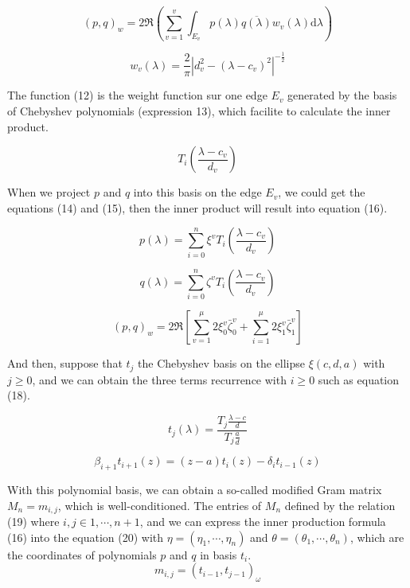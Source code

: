 {\begin{equation}
(p,q)_w=2\Re(\sum_{v=1}^v \int_{E_v}p(\lambda) \overline{q(\lambda)} w_v(\lambda)\mathrm{d}\lambda)
\end{equation}

\begin{equation}
w_v(\lambda)=\frac{2}{\pi}|d_v^2-(\lambda-c_v)^2|^{-\frac{1}{2}}
\end{equation}

The function (12) is the weight function sur one edge \(E_v\) generated by the basis of Chebyshev polynomials (expression 13), which facilite to calculate the inner product.

\begin{equation}
T_i(\frac{\lambda-c_v}{d_v})
\end{equation} 

When we project \(p\) and \(q\) into this basis on the edge \(E_v\), we could get the equations (14) and (15), then the inner product will result into equation (16).

\begin{equation}
p(\lambda)=\sum_{i=0}^n \xi ^v T_i(\frac{\lambda-c_v}{d_v})
\end{equation}

\begin{equation}
q(\lambda)=\sum_{i=0}^n \zeta ^v T_i(\frac{\lambda-c_v}{d_v})
\end{equation}

\begin{equation}
(p,q)_w=2\Re[\sum_{v=1}^\mu 2\xi_0^v \bar{\zeta}_0^v+\sum_{i=1}^\mu 2\xi_1^v \bar{\zeta}_1^v]
\end{equation}

And then, suppose that \(t_j\) the Chebyshev basis on the ellipse \(\xi(c,d,a)\) with \(j \geq 0\), and we can obtain the three terms recurrence with \(i \geq 0\) such as equation (18).

\begin{equation}
t_j(\lambda)=\frac{T_j \frac{\lambda-c}{d}}{T_j \frac{a}{d}}
\end{equation}

\begin{equation}
\beta_{i+1} t_{i+1}(z)=(z-a)t_i(z)-\delta_i t_{i-1}(z)
\end{equation}

With this polynomial basis, we can obtain a so-called modified Gram matrix \(M_n=m_{i,j}\), which is well-conditioned. The entries of \(M_n\) defined by the relation (19) where \(i,j \in 1,\cdots,n+1\), and we can express the inner production formula (16) into the equation (20) with \(\eta=(\eta_1,\cdots,\eta_n)\) and \(\theta=(\theta_1,\cdots,\theta_n)\), which are the coordinates of polynomials \(p\) and \(q\) in basis \(t_i\). 
\begin{equation}
m_{i,j}=(t_{i-1},t_{j-1})_\omega
\end{equation}

}

